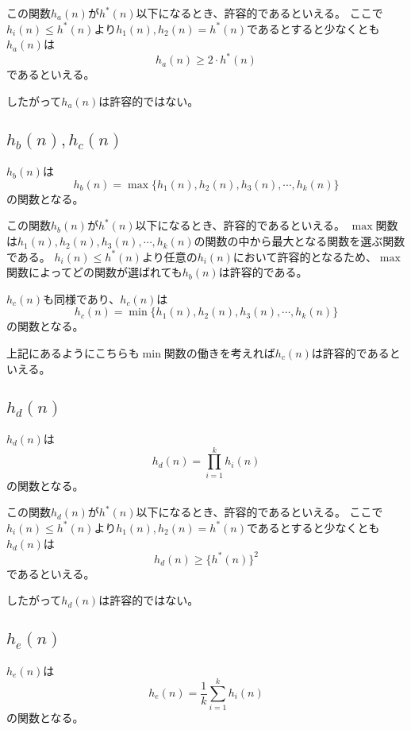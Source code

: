 \documentclass[a4paper,11pt,dvipdfmx]{jsarticle}
\begin{document}
この関数$h_a(n)$が$h^*(n)$以下になるとき、許容的であるといえる。
ここで$h_i(n) \leq h^*(n)$より$h_1(n), h_2(n) = h^*(n)$であるとすると少なくとも$h_a(n)$は
\begin{equation*}
    h_a(n) \geq 2 \cdot h^*(n)
\end{equation*}
であるといえる。

したがって$h_a(n)$は許容的ではない。

\subsection{$h_b(n),h_c(n)$}
$h_b(n)$は
\begin{equation*}
    h_b(n) = \max\{h_1(n),h_2(n),h_3(n),\cdots,h_k(n)\}
\end{equation*}
の関数となる。

この関数$h_b(n)$が$h^*(n)$以下になるとき、許容的であるといえる。
$\max$関数は$h_1(n),h_2(n),h_3(n),\cdots,h_k(n)$の関数の中から最大となる関数を選ぶ関数である。
$h_i(n) \leq h^*(n)$より任意の$h_i(n)$において許容的となるため、$\max$関数によってどの関数が選ばれても$h_b(n)$は許容的である。

$h_c(n)$も同様であり、$h_c(n)$は
\begin{equation*}
    h_c(n) = \min\{h_1(n),h_2(n),h_3(n),\cdots,h_k(n)\}
\end{equation*}
の関数となる。

上記にあるようにこちらも$\min$関数の働きを考えれば$h_c(n)$は許容的であるといえる。

\subsection{$h_d(n)$}
$h_d(n)$は
\begin{equation*}
    h_d(n) = \prod_{i=1}^{k}h_i(n)
\end{equation*}
の関数となる。

この関数$h_d(n)$が$h^*(n)$以下になるとき、許容的であるといえる。
ここで$h_i(n) \leq h^*(n)$より$h_1(n), h_2(n) = h^*(n)$であるとすると少なくとも$h_d(n)$は
\begin{equation*}
    h_d(n) \geq \{h^*(n)\}^2
\end{equation*}
であるといえる。

したがって$h_d(n)$は許容的ではない。

\subsection{$h_e(n)$}
$h_e(n)$は
\begin{equation*}
    h_e(n) = \frac{1}{k}\sum_{i=1}^{k}h_i(n)
\end{equation*}
の関数となる。
\end{document}
